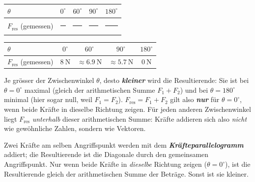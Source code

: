 \documentclass[addpoints,11pt,a4paper]{exam}
\newlength{\antwortraumlen}
\newcommand{\Antwortraum}[1]{%
  \pgfmathsetlength{\antwortraumlen}{#1*2.5cm}%
  \begin{answerbox}
    \rule{0pt}{\antwortraumlen}%
  \end{answerbox}%
}
\begin{document}
\begin{questions}
\begin{taskbox}
\begin{parts}
  \begin{center}
  \begin{tabular}{lcccc}
  \toprule
  $\theta$ & $0^\circ$ & $60^\circ$ & $90^\circ$ & $180^\circ$ \\
  \midrule
  $F_{\text{res}}$ (gemessen) & \rule{1.6cm}{0.4pt} & \rule{1.6cm}{0.4pt} & \rule{1.6cm}{0.4pt} & \rule{1.6cm}{0.4pt} \\
  \bottomrule
  \end{tabular}
  \end{center}
  \Antwortraum{2}
  \begin{solution}
  \begin{center}
  \begin{tabular}{lcccc}
  \toprule
  $\theta$ & $0^\circ$ & $60^\circ$ & $90^\circ$ & $180^\circ$ \\
  \midrule
  $F_{\text{res}}$ (gemessen) & $\SI{8}{\newton}$ & $\approx\SI{6.9}{\newton}$ & $\approx\SI{5.7}{\newton}$ & $\SI{0}{\newton}$ \\
  \bottomrule
  \end{tabular}
  \end{center}
  Je grösser der Zwischenwinkel $\theta$, desto \textbf{\emph{kleiner}} wird
  die Resultierende: Sie ist bei $\theta=0^\circ$ maximal (gleich der
  arithmetischen Summe $F_1+F_2$) und bei $\theta=180^\circ$ minimal (hier
  sogar null, weil $F_1=F_2$). $F_{\text{res}}=F_1+F_2$ gilt also
  \textbf{\emph{nur}} für $\theta=0^\circ$, wenn beide Kräfte in dieselbe
  Richtung zeigen. Für jeden anderen Zwischenwinkel liegt $F_{\text{res}}$
  \emph{unterhalb} dieser arithmetischen Summe: Kräfte addieren sich also
  \emph{nicht} wie gewöhnliche Zahlen, sondern wie Vektoren.
  \end{solution}
\end{parts}
\end{taskbox}
\end{questions}

\begin{formelbox}
Zwei Kräfte am selben Angriffspunkt werden mit dem
\textbf{\emph{Kräfteparallelogramm}} addiert; die Resultierende ist die
Diagonale durch den gemeinsamen Angriffspunkt. Nur wenn beide Kräfte in
\emph{dieselbe} Richtung zeigen ($\theta=0^\circ$), ist die Resultierende
gleich der arithmetischen Summe der Beträge. Sonst ist sie kleiner.
\end{formelbox}
\end{document}
